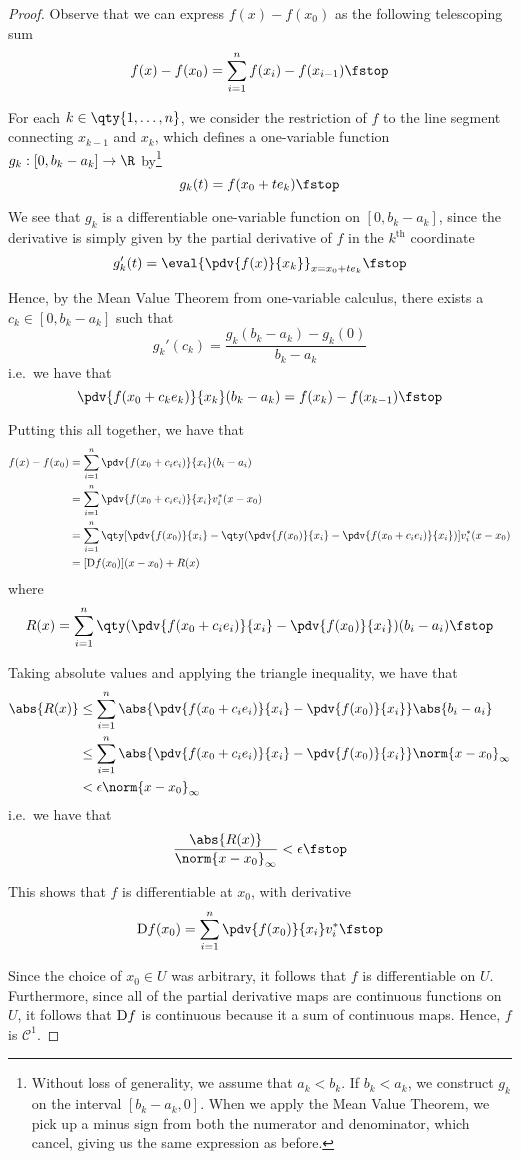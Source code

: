 \begin{proof}
  Observe that we can express \( f(x)-f(x_0) \) as the following telescoping sum
  \[ f(x)-f(x_0)=\sum_{i=1}^nf(x_i)-f(x_{i-1})\fstop \]

  For each \( k\in\qty{1,\dots,n} \), we consider the restriction of \( f \) to the line segment connecting \( x_{k-1} \) and \( x_k \), which defines a one-variable function \( g_k:[0,b_k-a_k]\to\R \) by\footnote{Without loss of generality, we assume that \( a_k<b_k \). If \( b_k<a_k \), we construct \( g_k \) on the interval \( [b_k-a_k,0] \). When we apply the Mean Value Theorem, we pick up a minus sign from both the numerator and denominator, which cancel, giving us the same expression as before.}
  \[ g_k(t)=f(x_0+te_k)\fstop \]

  We see that \( g_k \) is a differentiable one-variable function on \( [0,b_k-a_k] \), since the derivative is simply given by the partial derivative of \( f \) in the \( k^{\text{th}} \) coordinate
  \[ g_k'(t)=\eval{\pdv{f(x)}{x_k}}_{x=x_0+te_k}\fstop \]

  Hence, by the Mean Value Theorem from one-variable calculus, there exists a \( c_k\in [0,b_k-a_k] \) such that
  \[ g_k'(c_k)=\frac{g_k(b_k-a_k)-g_k(0)}{b_k-a_k} \]
  i.e.\ we have that
  \[ {\pdv{f(x_0+c_k e_k)}{x_k}}(b_k-a_k)=f(x_k)-f(x_{k-1})\fstop \]

  Putting this all together, we have that
  \begin{align*}
    f(x)-f(x_0)&=\sum_{i=1}^n{\pdv{f(x_0+c_i e_i)}{x_i}}(b_i-a_i)\\
    &=\sum_{i=1}^n{\pdv{f(x_0+c_i e_i)}{x_i}}v_i^*(x-x_0)\\
    &= \sum_{i=1}^n\qty[{\pdv{f(x_0)}{x_i}}-\qty({\pdv{f(x_0)}{x_i}}-{\pdv{f(x_0+c_i e_i)}{x_i}})]v_i^*(x-x_0)\\
    &= [\D f(x_0)](x-x_0)+R(x)
  \end{align*}
  where
  \[ R(x)=\sum_{i=1}^n\qty({\pdv{f(x_0+c_i e_i)}{x_i}}-{\pdv{f(x_0)}{x_i}})(b_i-a_i)\fstop \]

  Taking absolute values and applying the triangle inequality, we have that
  \begin{align*}
    \abs{R(x)}&\leq\sum_{i=1}^n\abs{{\pdv{f(x_0+c_i e_i)}{x_i}}-{\pdv{f(x_0)}{x_i}}}\abs{b_i-a_i}\\
    &\leq\sum_{i=1}^n\abs{{\pdv{f(x_0+c_i e_i)}{x_i}}-{\pdv{f(x_0)}{x_i}}}\norm{x-x_0}_\infty\\
    &<\epsilon\norm{x-x_0}_\infty
  \end{align*}
  i.e.\ we have that
  \[ \frac{\abs{R(x)}}{\norm{x-x_0}_\infty}<\epsilon\fstop \]

  This shows that \( f \) is differentiable at \( x_0 \), with derivative
  \[ \D f(x_0)=\sum_{i=1}^n{\pdv{f(x_0)}{x_i}}v_i^*\fstop \]

  Since the choice of \( x_0\in U \) was arbitrary, it follows that \( f \) is differentiable on \( U \). Furthermore, since all of the partial derivative maps are continuous functions on \( U \), it follows that \( \text{D} f \) is continuous because it a sum of continuous maps. Hence, \( f \) is \( \mathcal{C}^1 \).
\end{proof}

